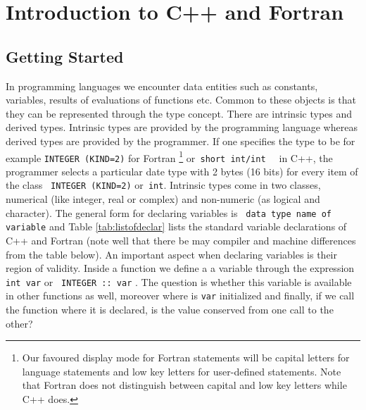 \chapter{Introduction to C++ and Fortran}\label{chap:numanalysis}



\section{Getting Started}



In programming languages
we encounter data entities such
as constants, variables, results of evaluations of functions
etc. Common to these objects is that they can be represented
through the type concept. There are intrinsic types and derived
types. Intrinsic types are provided by the programming language
whereas derived types are provided by the programmer.
If one specifies the type to be for example \verb?INTEGER (KIND=2)? 
for Fortran \footnote{Our favoured display mode for Fortran statements
will be capital letters for language statements and low key
letters for user-defined statements. Note that Fortran
does not distinguish between capital and low key letters while
C++ does.}
or\verb? short int/int  ? in C++,
the programmer selects a particular date type with 2 bytes
(16 bits) for every item of the class
\verb? INTEGER (KIND=2)? or\verb? int?. Intrinsic types come
in two classes, numerical (like integer, real or complex)
and non-numeric (as logical and character).
The general form for declaring  variables is 
\verb? data type name of variable?
and Table \ref{tab:listofdeclar} 
lists the standard variable declarations of C++ and Fortran 
(note well that there be may compiler and machine differences from the table below).
An important aspect when declaring variables is their
region of validity.
Inside a function we define a a variable through the expression 
\verb?int var? or \verb? INTEGER :: var? . The question is 
whether this variable is available in
other functions as well, moreover where is 
\verb?var? initialized and finally, if we call the function where
it is declared, is the value conserved from one call to the other?
